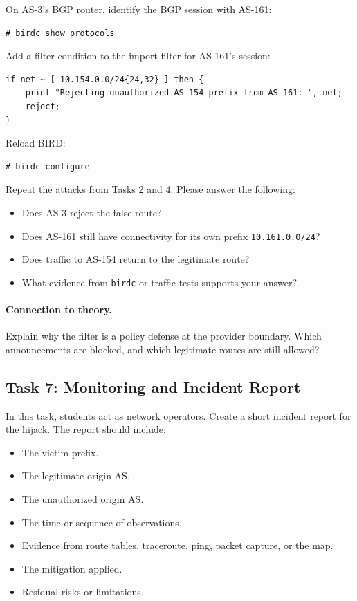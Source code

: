 On AS-3's BGP router, identify the BGP session with AS-161:

\begin{lstlisting}
# birdc show protocols
\end{lstlisting}

Add a filter condition to the import filter for AS-161's session:

\begin{lstlisting}
if net ~ [ 10.154.0.0/24{24,32} ] then {
    print "Rejecting unauthorized AS-154 prefix from AS-161: ", net;
    reject;
}
\end{lstlisting}

Reload BIRD:

\begin{lstlisting}
# birdc configure
\end{lstlisting}

Repeat the attacks from Tasks 2 and 4. Please answer the following:

\begin{itemize}[noitemsep]
\item Does AS-3 reject the false route?
\item Does AS-161 still have connectivity for its own prefix
      \texttt{10.161.0.0/24}?
\item Does traffic to AS-154 return to the legitimate route?
\item What evidence from \texttt{birdc} or traffic tests supports your answer?
\end{itemize}

\paragraph{Connection to theory.}
Explain why the filter is a policy defense at the provider boundary. Which
announcements are blocked, and which legitimate routes are still allowed?


\subsection{Task 7: Monitoring and Incident Report}

In this task, students act as network operators. Create a short incident report
for the hijack. The report should include:

\begin{itemize}[noitemsep]
\item The victim prefix.
\item The legitimate origin AS.
\item The unauthorized origin AS.
\item The time or sequence of observations.
\item Evidence from route tables, traceroute, ping, packet capture, or the map.
\item The mitigation applied.
\item Residual risks or limitations.
\end{itemize}

